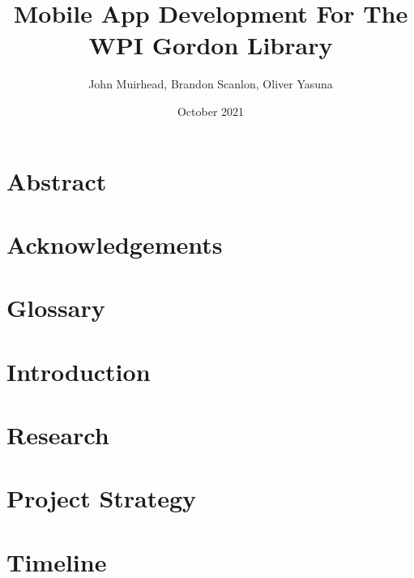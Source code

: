 \documentclass[oneside, 12pt]{book}
\title{Mobile App Development For The WPI Gordon Library}
\author{John Muirhead, Brandon Scanlon, Oliver Yasuna}
\date{October 2021}
\begin{document}
\maketitle

\frontmatter
    \tableofcontents
    \chapter{Abstract}
        
    \chapter{Acknowledgements}
        
    \chapter{Glossary}
        

\mainmatter%
    \chapter{Introduction}
        
    \chapter{Research}
        
    \chapter{Project Strategy}
        
    \chapter{Timeline}
        
\end{document}
